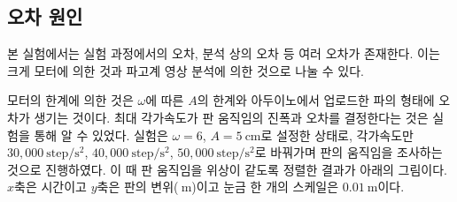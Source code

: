 \subsection{오차 원인}

본 실험에서는 실험 과정에서의 오차, 분석 상의 오차 등 여러 오차가 존재한다. 이는 크게 모터에 의한 것과 파고계 영상 분석에 의한 것으로 나눌 수 있다.

모터의 한계에 의한 것은 $\omega$에 따른 $A$의 한계와 아두이노에서 업로드한 파의 형태에 오차가 생기는 것이다. 최대 각가속도가 판 움직임의 진폭과 오차를 결정한다는 것은 실험을 통해 알 수 있었다. 실험은 $\omega = 6$, $A = 5\mathrm{~cm}$로 설정한 상태로, 각가속도만 $30,000\mathrm{~step/s^2}$, $40,000\mathrm{~step/s^2}$, $50,000\mathrm{~step/s^2}$로 바꿔가며 판의 움직임을 조사하는 것으로 진행하였다. 이 때 판 움직임을 위상이 같도록 정렬한 결과가 아래의 그림이다. $x$축은 시간이고 $y$축은 판의 변위($\mathrm{~m}$)이고 눈금 한 개의 스케일은 $0.01\mathrm{~m}$이다.

